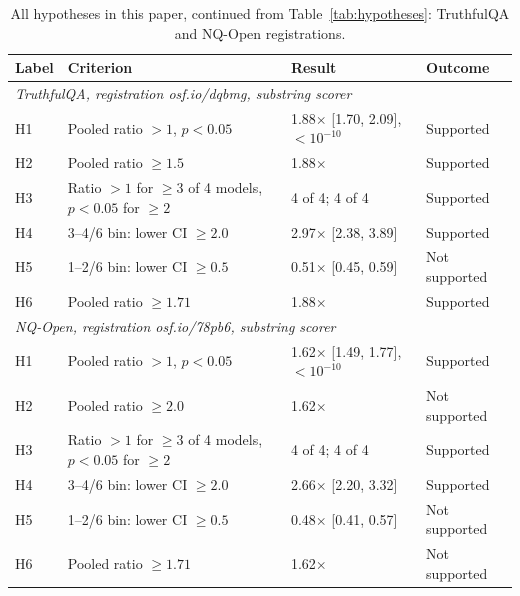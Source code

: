 \begin{table}[tbp]
\centering
\footnotesize
\setlength{\tabcolsep}{4pt}
\begin{tabular}{@{}lp{5.0cm}p{5.9cm}>{\raggedright\arraybackslash}p{2.2cm}@{}}
\toprule
Label & Criterion & Result & Outcome \\
\midrule
\multicolumn{4}{l}{\textit{TruthfulQA, registration osf.io/dqbmg, substring scorer}} \\
H1 & Pooled ratio $>1$, $p<0.05$ & 1.88$\times$ [1.70, 2.09], $<10^{-10}$ & Supported \\
H2 & Pooled ratio $\geq 1.5$ & 1.88$\times$ & Supported \\
H3 & Ratio $>1$ for $\geq 3$ of 4 models, $p<0.05$ for $\geq 2$ & 4 of 4; 4 of 4 & Supported \\
H4 & 3--4/6 bin: lower CI $\geq 2.0$ & 2.97$\times$ [2.38, 3.89] & Supported \\
H5 & 1--2/6 bin: lower CI $\geq 0.5$ & 0.51$\times$ [0.45, 0.59] & Not supported \\
H6 & Pooled ratio $\geq 1.71$ & 1.88$\times$ & Supported \\
\midrule
\multicolumn{4}{l}{\textit{NQ-Open, registration osf.io/78pb6, substring scorer}} \\
H1 & Pooled ratio $>1$, $p<0.05$ & 1.62$\times$ [1.49, 1.77], $<10^{-10}$ & Supported \\
H2 & Pooled ratio $\geq 2.0$ & 1.62$\times$ & Not supported \\
H3 & Ratio $>1$ for $\geq 3$ of 4 models, $p<0.05$ for $\geq 2$ & 4 of 4; 4 of 4 & Supported \\
H4 & 3--4/6 bin: lower CI $\geq 2.0$ & 2.66$\times$ [2.20, 3.32] & Supported \\
H5 & 1--2/6 bin: lower CI $\geq 0.5$ & 0.48$\times$ [0.41, 0.57] & Not supported \\
H6 & Pooled ratio $\geq 1.71$ & 1.62$\times$ & Not supported \\
\bottomrule
\end{tabular}
\caption{All hypotheses in this paper, continued from Table~\ref{tab:hypotheses}: TruthfulQA and NQ-Open registrations.}
\label{tab:hypotheses-2}
\end{table}
